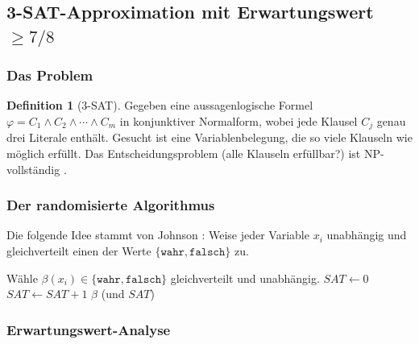 ﻿\documentclass[12pt,a4paper]{article}
\theoremstyle{definition}
\newtheorem{definition}{Definition}[section]
\theoremstyle{plain}
\theoremstyle{remark}
\begin{document}
\subsection{3-SAT-Approximation mit Erwartungswert $\geq 7/8$}
\label{subsec:3sat}

\subsubsection{Das Problem}

\begin{definition}[3-SAT]\label{def:3sat}
  Gegeben eine aussagenlogische Formel $\varphi = C_1 \wedge C_2 \wedge \cdots
  \wedge C_m$ in konjunktiver Normalform, wobei jede Klausel $C_j$ genau drei
  Literale enthält. Gesucht ist eine Variablenbelegung, die so viele Klauseln
  wie möglich erfüllt. Das Entscheidungsproblem (alle Klauseln erfüllbar?) ist
  NP-vollständig \cite{cook1971complexity}.
\end{definition}

\subsubsection{Der randomisierte Algorithmus}

Die folgende Idee stammt von Johnson \cite{johnson1974approximation}:
Weise jeder Variable $x_i$ unabhängig und gleichverteilt einen der Werte
$\{\mathtt{wahr}, \mathtt{falsch}\}$ zu.

\begin{algorithm}[H]
  \caption{Randomisierte 3-SAT-Approximation}
  \label{alg:3sat}
  \begin{algorithmic}[1]
      \State Wähle $\beta(x_i) \in \{\texttt{wahr}, \texttt{falsch}\}$
             gleichverteilt und unabhängig.
    \EndFor
    \State $\mathit{SAT} \gets 0$
        \State $\mathit{SAT} \gets \mathit{SAT} + 1$
      \EndIf
    \EndFor
    \State \Return $\beta$ (und $\mathit{SAT}$)
  \end{algorithmic}
\end{algorithm}

\subsubsection{Erwartungswert-Analyse}
\end{document}
